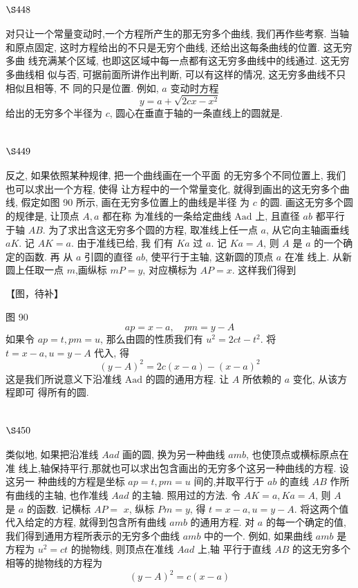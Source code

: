 \section{$\S 448$}

对只让一个常量变动时,一个方程所产生的那无穷多个曲线, 我们再作些考察. 当轴 和原点固定, 这时方程给出的不只是无穷个曲线, 还给出这每条曲线的位置. 这无穷多曲 线充满某个区域, 也即这区域中每一点都有这无穷多曲线中的线通过. 这无穷多曲线相 似与否, 可据前面所讲作出判断, 可以有这样的情况, 这无穷多曲线不只相似且相等, 不 同的只是位置. 例如, $a$ 变动时方程
\[
y=a+\sqrt{2 c x-x^{2}}
\]
给出的无穷多个半径为 $c$, 圆心在垂直于轴的一条直线上的圆就是.

\section{$\S 449$}

反之, 如果依照某种规律, 把一个曲线画在一个平面 的无穷多个不同位置上, 我们也可以求出一个方程, 使得 让方程中的一个常量变化, 就得到画出的这无穷多个曲 线, 假定如图 90 所示, 画在无穷多位置上的曲线是半径 为 $c$ 的圆. 画这无穷多个圆的规律是, 让顶点 $A, a$ 都在称 为准线的一条给定曲线 $\mathrm{Aad}$ 上, 且直径 $a b$ 都平行于轴 $A B$. 为了求出含这无穷多个圆的方程, 取准线上任一点 $a$, 从它向主轴画垂线 $a K$. 记 $A K=a$. 由于准线已给, 我 们有 $K a$ 过 $a$. 记 $K a=A$, 则 $A$ 是 $a$ 的一个确定的函数. 再 从 $a$ 引圆的直径 $a b$, 使平行于主轴, 这新圆的顶点 $a$ 在准 线上. 从新圆上任取一点 $m$,画纵标 $m P=y$, 对应横标为 $A P=x$. 这样我们得到


【图，待补】

图 90
\[
a p=x-a, \quad p m=y-A
\]
如果令 $a p=t, p m=u$, 那么由圆的性质我们有 $u^{2}=2 c t-t^{2}$. 将 $t=x-a, u=y-A$ 代入, 得
\[
(y-A)^{2}=2 c(x-a)-(x-a)^{2}
\]
这是我们所说意义下沿准线 $\mathrm{Aad}$ 的圆的通用方程. 让 $A$ 所依赖的 $a$ 变化, 从该方程即可 得所有的圆.

\section{$\S 450$}

类似地, 如果把沿准线 $A a d$ 画的圆, 换为另一种曲线 $a m b$, 也使顶点或横标原点在准 线上,轴保持平行,那就也可以求出包含画出的无穷多个这另一种曲线的方程. 设这另一 种曲线的方程是坐标 $a p=t, p m=u$ 间的,并取平行于 $a b$ 的直线 $A B$ 作所有曲线的主轴, 也作准线 $A a d$ 的主轴. 照用过的方法. 令 $A K=a, K a=A$, 则 $A$ 是 $a$ 的函数. 记横标 $A P=$ $x$, 纵标 $P m=y$, 得 $t=x-a, u=y-A$. 将这两个值代入给定的方程, 就得到包含所有曲线 $a m b$ 的通用方程. 对 $a$ 的每一个确定的值,我们得到通用方程所表示的无穷多个曲线 $a m b$ 中的一个. 例如, 如果曲线 $a m b$ 是方程为 $u^{2}=c t$ 的抛物线, 则顶点在准线 $A a d$ 上,轴 平行于直线 $A B$ 的这无穷多个相等的抛物线的方程为
\[
(y-A)^{2}=c(x-a)
\]
